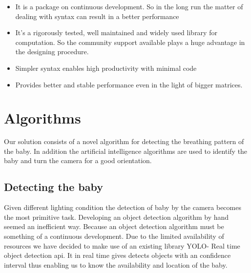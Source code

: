 \documentclass{report}
\begin{document}
\begin{itemize}
    \item It is a package on continuous development. So in the long run the matter of dealing with syntax can result in a better performance
    
    \item It's a rigorously tested, well maintained and widely used library for computation. So the community support available plays a huge advantage in the designing procedure. 
    
    \item Simpler syntax  enables high productivity with minimal code
    
    \item Provides better and stable performance even in the light of bigger matrices.
\end{itemize}

\section{Algorithms}
Our solution consists of a novel algorithm for detecting the breathing pattern of the baby. In addition the artificial intelligence algorithms are used to identify the baby and turn the camera for a good orientation.\\

\subsection{Detecting the baby}

Given different lighting condition the detection of baby by the camera becomes the most primitive task. Developing an object detection algorithm by hand seemed an inefficient way. Because an object detection algorithm must be something of a continuous development. Due to the limited availability of resources  we have decided to make use of an existing library YOLO- Real time object detection api. It in real time gives detects objects with an confidence interval thus enabling us to know the availability and location of the baby. 
\end{document}
